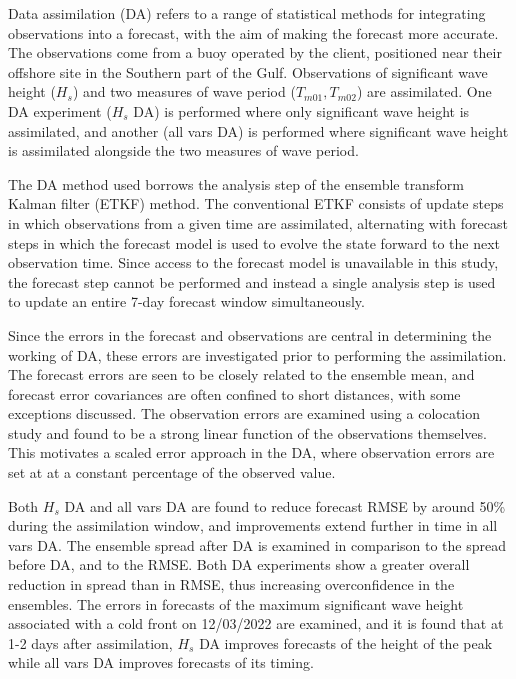 \documentclass[
11pt, %
english, %
onehalfspacing, %
parskip, %
headsepline, %
]{MastersDoctoralThesis} %
\begin{document}
Data assimilation (DA) refers to a range of statistical methods for integrating observations into a forecast, with the aim of making the forecast more accurate. The observations come from a buoy operated by the client, positioned near their offshore site in the Southern part of the Gulf. Observations of significant wave height ($H_s$) and two measures of wave period ($T_{m01},T_{m02}$) are assimilated. One DA experiment ($H_s$ DA) is performed where only significant wave height is assimilated, and another (all vars DA) is performed where significant wave height is assimilated alongside the two measures of wave period.

The DA method used borrows the analysis step of the ensemble transform Kalman filter (ETKF) method. The conventional ETKF consists of update steps in which observations from a given time are assimilated, alternating with forecast steps in which the forecast model is used to evolve the state forward to the next observation time. Since access to the forecast model is unavailable in this study, the forecast step cannot be performed and instead a single analysis step is used to update an entire 7-day forecast window simultaneously.


Since the errors in the forecast and observations are central in determining the working of DA, these errors are investigated prior to performing the assimilation. The forecast errors are seen to be closely related to the ensemble mean, and forecast error covariances are often confined to short distances, with some exceptions discussed. The observation errors are examined using a colocation study and found to be a strong linear function of the observations themselves. This motivates a scaled error approach in the DA, where observation errors are set at at a constant percentage of the observed value.

Both $H_s$ DA and all vars DA are found to reduce forecast RMSE by around 50\% during the assimilation window, and improvements extend further in time in all vars DA. The ensemble spread after DA is examined in comparison to the spread before DA, and to the RMSE. Both DA experiments show a greater overall reduction in spread than in RMSE, thus increasing overconfidence in the ensembles. The errors in forecasts of the maximum significant wave height associated with a cold front on 12/03/2022 are examined, and it is found that at 1-2 days after assimilation, $H_s$ DA improves forecasts of the height of the peak while all vars DA improves forecasts of its timing.
\end{document}
